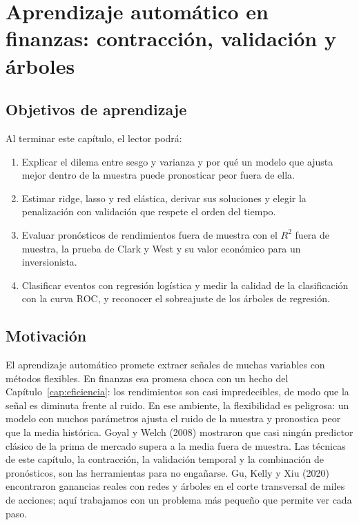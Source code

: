 \chapter[Aprendizaje automático]{Aprendizaje automático en finanzas: contracción, validación y árboles}\label{cap:aprendizaje}

\section*{Objetivos de aprendizaje}
Al terminar este capítulo, el lector podrá:
\begin{enumerate}[label=\arabic*.,leftmargin=*]
  \item Explicar el dilema entre sesgo y varianza y por qué un modelo que ajusta mejor dentro de la muestra puede
        pronosticar peor fuera de ella.
  \item Estimar ridge, lasso y red elástica, derivar sus soluciones y elegir la penalización con validación que
        respete el orden del tiempo.
  \item Evaluar pronósticos de rendimientos fuera de muestra con el $R^2$ fuera de muestra, la prueba de Clark y
        West y su valor económico para un inversionista.
  \item Clasificar eventos con regresión logística y medir la calidad de la clasificación con la curva ROC, y
        reconocer el sobreajuste de los árboles de regresión.
\end{enumerate}

\section*{Motivación}
El aprendizaje automático promete extraer señales de muchas variables con métodos flexibles. En finanzas esa promesa
choca con un hecho del Capítulo~\ref{cap:eficiencia}: los rendimientos son casi impredecibles, de modo que la señal es
diminuta frente al ruido. En ese ambiente, la flexibilidad es peligrosa: un modelo con muchos parámetros ajusta el
ruido de la muestra y pronostica peor que la media histórica. Goyal y Welch (2008) mostraron que casi ningún predictor
clásico de la prima de mercado supera a la media fuera de muestra. Las técnicas de este capítulo, la contracción, la
validación temporal y la combinación de pronósticos, son las herramientas para no engañarse. Gu, Kelly y Xiu (2020)
encontraron ganancias reales con redes y árboles en el corte transversal de miles de acciones; aquí trabajamos con un
problema más pequeño que permite ver cada paso.

